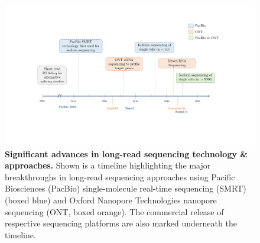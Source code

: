 \begin{landscape}
	\begin{figure}[]
		\centering
		\includegraphics[page=1,trim={0 4cm 1.8cm 2cm},clip, scale = 0.8]{Figures/Introduction_Figures_Landscape.pdf}
		\caption[Timeline of long-read sequencing technologies and approaches]%
		{\textbf{Significant advances in long-read sequencing technology \& approaches.} Shown is a timeline highlighting the major breakthroughs in long-read sequencing approaches using Pacific Biosciences (PacBio) single-molecule real-time sequencing (SMRT) (boxed blue) and Oxford Nanopore Technologies nanopore sequencing (ONT, boxed orange). The commercial release of respective sequencing platforms are also marked underneath the timeline.}
		\label{fig:longread_timeline}
	\end{figure}
\end{landscape}


